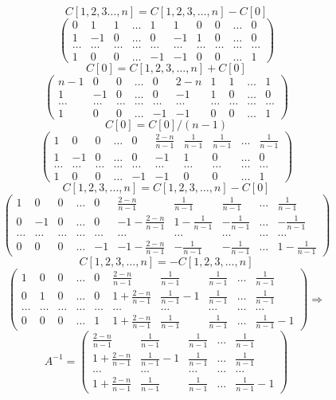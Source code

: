 \documentclass[a4paper]{article}
\newcommand{\mat}[1]{\begin{pmatrix} #1 \end{pmatrix}}
\renewcommand{\f}[2]{\frac{#1}{#2}}
\renewcommand{\r}{\Rightarrow}
\begin{document}
\begin{enumerate}
    $$C[1, 2, 3 \dots, n] = C[1, 2, 3, \dots, n]-C[0]$$
    $$\mat{0 & 1 & 1 & \dots & 1 & 1 & 0 & 0 & \dots & 0\\
            1 & -1 & 0 & \dots & 0 & -1 & 1 & 0 & \dots & 0\\
            \dots & \dots & \dots & \dots & \dots & \dots & \dots & \dots & \dots & \dots\\
            1 & 0 & 0 & \dots & -1 & -1 & 0 & 0 & \dots & 1}$$
    $$C[0] = C[1, 2, 3, \dots, n] + C[0]$$
    $$\mat{n-1 & 0 & 0 & \dots & 0 & 2-n & 1 & 1 & \dots & 1\\
            1 & -1 & 0 & \dots & 0 & -1 & 1 & 0 & \dots & 0\\
            \dots & \dots & \dots & \dots & \dots & \dots & \dots & \dots & \dots & \dots\\
            1 & 0 & 0 & \dots & -1 & -1 & 0 & 0 & \dots & 1}$$
    $$C[0] = C[0]/(n-1)$$
    $$\mat{1 & 0 & 0 & \dots & 0 & \f{2-n}{n-1} & \f{1}{n-1} & \f{1}{n-1} & \dots & \f{1}{n-1}\\
            1 & -1 & 0 & \dots & 0 & -1 & 1 & 0 & \dots & 0\\
            \dots & \dots & \dots & \dots & \dots & \dots & \dots & \dots & \dots & \dots\\
            1 & 0 & 0 & \dots & -1 & -1 & 0 & 0 & \dots & 1}$$
    $$C[1, 2, 3, \dots, n] =C[1, 2, 3, \dots, n] - C[0] $$
    $$\mat{1 & 0 & 0 & \dots & 0 & \f{2-n}{n-1} & \f{1}{n-1} & \f{1}{n-1} & \dots & \f{1}{n-1}\\
            0 & -1 & 0 & \dots & 0 & -1 - \f{2-n}{n-1} & 1 - \f{1}{n-1} & -\f{1}{n-1} & \dots & -\f{1}{n-1}\\
            \dots & \dots & \dots & \dots & \dots & \dots & \dots & \dots & \dots & \dots\\
            0 & 0 & 0 & \dots & -1 & -1 - \f{2-n}{n-1} & -\f{1}{n-1} & -\f{1}{n-1} & \dots & 1-\f{1}{n-1}}$$
    $$C[1, 2, 3, \dots, n] = -C[1, 2, 3, \dots, n]$$
    $$\mat{1 & 0 & 0 & \dots & 0 & \f{2-n}{n-1} & \f{1}{n-1} & \f{1}{n-1} & \dots & \f{1}{n-1}\\
            0 & 1 & 0 & \dots & 0 & 1 + \f{2-n}{n-1} & \f{1}{n-1}-1 & \f{1}{n-1} & \dots & \f{1}{n-1}\\
            \dots & \dots & \dots & \dots & \dots & \dots & \dots & \dots & \dots & \dots\\
            0 & 0 & 0 & \dots & 1 & 1 + \f{2-n}{n-1} & \f{1}{n-1} & \f{1}{n-1} & \dots & \f{1}{n-1}-1} \r$$
    $$A^{-1} = \mat{\f{2-n}{n-1} & \f{1}{n-1} & \f{1}{n-1} & \dots & \f{1}{n-1} \\
                    1 + \f{2-n}{n-1} & \f{1}{n-1}-1 & \f{1}{n-1} & \dots & \f{1}{n-1}\\
                    \dots & \dots & \dots & \dots & \dots\\
                    1 + \f{2-n}{n-1} & \f{1}{n-1} & \f{1}{n-1} & \dots & \f{1}{n-1}-1}$$

\end{enumerate}
\end{document}
